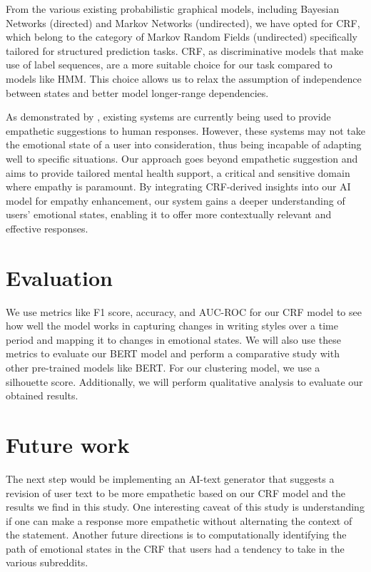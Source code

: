 \documentclass[conference,compsoc]{IEEEtran}
\begin{document}
From the various existing probabilistic graphical models, including Bayesian Networks (directed) and Markov Networks (undirected), we have opted for CRF, which belong to the category of Markov Random Fields (undirected) specifically tailored for structured prediction tasks. CRF, as discriminative models that make use of label sequences, are a more suitable choice for our task compared to models like HMM. This choice allows us to relax the assumption of independence between states and better model longer-range dependencies.

As demonstrated by \citet{Sharma+23:human-ai-empathic-conversation}, existing systems are currently being used to provide empathetic suggestions to human responses. However, these systems may not take the emotional state of a user into consideration, thus being incapable of adapting well to specific situations. Our approach goes beyond empathetic suggestion and aims to provide tailored mental health support, a critical and sensitive domain where empathy is paramount. By integrating CRF-derived insights into our AI model for empathy enhancement, our system gains a deeper understanding of users' emotional states, enabling it to offer more contextually relevant and effective responses.

\section{Evaluation}
We use metrics like F1 score, accuracy, and AUC-ROC for our CRF model to see how well the model works in capturing changes in writing styles over a time period and mapping it to changes in emotional states. We will also use these metrics to evaluate our BERT model and perform a comparative study with other pre-trained models like BERT. For our clustering model, we use a silhouette score. Additionally, we will  perform qualitative analysis to evaluate our obtained results. 

\section{Future work}
The next step would be implementing an AI-text generator that suggests a revision of user text to be more empathetic based on our CRF model and the results we find in this study. One interesting caveat of this study is understanding if one can make a response more empathetic without alternating the context of the statement. Another future directions is to computationally identifying the path of emotional states in the CRF that users had a tendency to take in the various subreddits.



\end{document}
